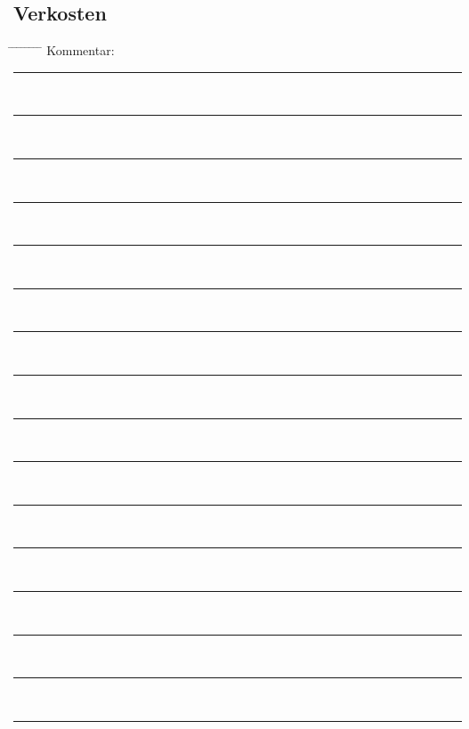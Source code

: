 \documentclass[12pt,oneside,a4paper]{scrartcl}
\begin{document}
{\subsection*{Verkosten}
\begin{tabbing}
	\hspace{1cm} \= \hspace{1cm} \= \hspace{1cm} \= \hspace{1cm} \= \hspace{1cm} \= \hspace{1cm} \= \hspace{1cm} \= \hspace{1cm} \= \kill
	\> Kommentar: \>\>\> \rule[-0.1cm]{13cm}{0.5pt}\\
	\> \>  \rule[-0.1cm]{15.3cm}{0.5pt}\\
	\> \>  \rule[-0.1cm]{15.3cm}{0.5pt}\\
	\> \>  \rule[-0.1cm]{15.3cm}{0.5pt}\\		
	\> \>  \rule[-0.1cm]{15.3cm}{0.5pt}\\
	\> \>  \rule[-0.1cm]{15.3cm}{0.5pt}\\
	\> \>  \rule[-0.1cm]{15.3cm}{0.5pt}\\
	\> \>  \rule[-0.1cm]{15.3cm}{0.5pt}\\
	\> \>  \rule[-0.1cm]{15.3cm}{0.5pt}\\
	\> \>  \rule[-0.1cm]{15.3cm}{0.5pt}\\
	\> \>  \rule[-0.1cm]{15.3cm}{0.5pt}\\
	\> \>  \rule[-0.1cm]{15.3cm}{0.5pt}\\
	\> \>  \rule[-0.1cm]{15.3cm}{0.5pt}\\
	\> \>  \rule[-0.1cm]{15.3cm}{0.5pt}\\
	\> \>  \rule[-0.1cm]{15.3cm}{0.5pt}\\
	\> \>  \rule[-0.1cm]{15.3cm}{0.5pt}
\end{tabbing}}
\end{document}
